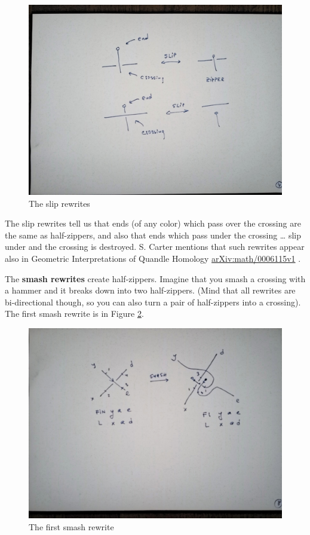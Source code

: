 \documentclass[]{article}
\begin{document}
\begin{figure}[h!]
\centering
\includegraphics[width=0.75\linewidth]{img/3731.jpg}
\caption{The slip rewrites}
\label{The-slip-rewrites}
\end{figure}

The slip rewrites tell us that ends (of any color) which pass over the
crossing are the same as half-zippers, and also that ends which pass
under the crossing \ldots{} slip under and the crossing is destroyed. S.
Carter mentions that such rewrites appear also in \cite{carter} Geometric
Interpretations of Quandle Homology
\href{https://arxiv.org/abs/math/0006115v1}{arXiv:math/0006115v1} .

The \textbf{smash rewrites} create half-zippers. Imagine that you smash
a crossing with a hammer and it breaks down into two half-zippers. (Mind
that all rewrites are bi-directional though, so you can also turn a pair
of half-zippers into a crossing). The first smash rewrite is in Figure \ref{The-first-smash-rewrite}.

\begin{figure}[h!]
\centering
\includegraphics[width=0.75\linewidth]{img/3833.jpg}
\caption{The first smash rewrite}
\label{The-first-smash-rewrite}
\end{figure}
\end{document}
